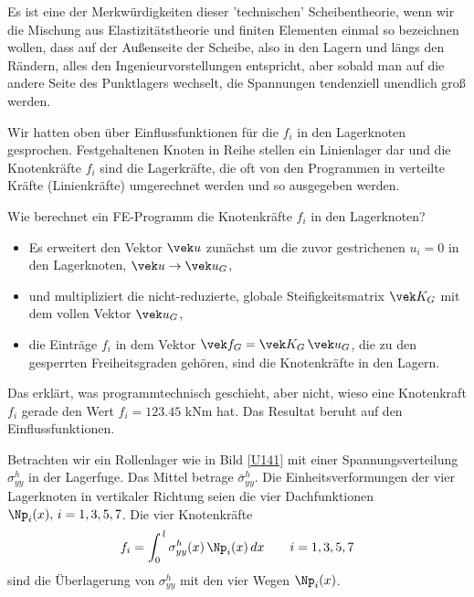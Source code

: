 {\begin{remark}
Es ist eine der Merkw\"{u}rdigkeiten dieser  'technischen' Scheibentheorie, wenn wir die Mischung aus Elastizit\"{a}tstheorie und finiten Elementen einmal so bezeichnen wollen, dass auf der Au{\ss}enseite der Scheibe, also in den Lagern und l\"{a}ngs den R\"{a}ndern, alles den Ingenieurvorstellungen entspricht, aber sobald man auf die andere Seite des Punktlagers wechselt, die Spannungen tendenziell unendlich gro{\ss} werden.
\end{remark}



Wir hatten oben \"{u}ber Einflussfunktionen f\"{u}r die $f_i$ in den Lagerknoten gesprochen.
Festgehaltenen Knoten in Reihe stellen ein Linienlager dar und die Knotenkr\"{a}fte $f_i$ sind die Lagerkr\"{a}fte, die oft von den Programmen in verteilte Kr\"{a}fte (Linienkr\"{a}fte) umgerechnet werden und so ausgegeben werden.

Wie berechnet ein FE-Programm die Knotenkr\"{a}fte $f_i$ in den Lagerknoten? \\
\begin{itemize}
  \item Es erweitert den Vektor $\vek u$ zun\"{a}chst um die zuvor gestrichenen $u_i = 0$ in den Lagerknoten, $\vek u \to \vek u_{G}$,
  \item und multipliziert die nicht-reduzierte, globale Steifigkeitsmatrix $\vek K_{G}$ mit dem vollen Vektor $\vek u_{G}$,
  \item die Eintr\"{a}ge $f_i$ in dem Vektor $\vek f_{G} = \vek K_{G}\,\vek u_{G}$, die zu den gesperrten Freiheitsgraden geh\"{o}ren, sind die Knotenkr\"{a}fte in den Lagern.
\end{itemize}

Das erkl\"{a}rt, was programmtechnisch geschieht, aber nicht, wieso eine Knotenkraft $f_i$ gerade den Wert $f_i = 123.45$ kNm hat. Das Resultat beruht auf den Einflussfunktionen.

Betrachten wir ein Rollenlager wie in Bild \ref{U141} mit einer Spannungsverteilung $\sigma_{yy}^h$ in der Lagerfuge. Das Mittel betrage $\bar{\sigma}_{yy}^h$. Die Einheitsverformungen der vier Lagerknoten in vertikaler Richtung seien die vier Dachfunktionen $\Np_i(x), \,i = 1,3, 5, 7$. Die vier Knotenkr\"{a}fte
\begin{align}
f_i = \int_0^{\,l} \sigma_{yy}^h(x)\,\Np_i(x)\,dx \qquad i = 1,3,5,7
\end{align}
sind die \"{U}berlagerung von $\sigma_{yy}^h$ mit den vier Wegen $\Np_i(x)$.

}
